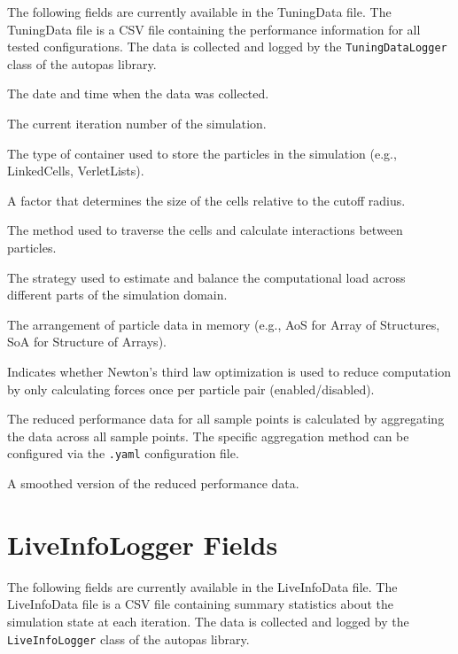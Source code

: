 The following fields are currently available in the TuningData file.
The TuningData file is a CSV file containing the performance information for all tested configurations. The data is collected and logged by the \texttt{TuningDataLogger} class of the \gls{autopas} library.

\begin{description}[style=multiline, leftmargin =40mm]
  \item[Date] The date and time when the data was collected.
  \item[Iteration] The current iteration number of the simulation.
  \item[Container] The type of container used to store the particles in the simulation (e.g., LinkedCells, VerletLists).
  \item[CellSizeFactor] A factor that determines the size of the cells relative to the cutoff radius.
  \item[Traversal] The method used to traverse the cells and calculate interactions between particles.
  \item[Load Estimator] The strategy used to estimate and balance the computational load across different parts of the simulation domain.
  \item[Data Layout] The arrangement of particle data in memory (e.g., AoS for Array of Structures, SoA for Structure of Arrays).
  \item[Newton 3] Indicates whether Newton's third law optimization is used to reduce computation by only calculating forces once per particle pair (enabled/disabled).
  \item[Reduced] The reduced performance data for all sample points is calculated by aggregating the data across all sample points. The specific aggregation method can be configured via the \texttt{.yaml} configuration file.
  \item[Smoothed] A smoothed version of the reduced performance data.

\end{description}

\section{LiveInfoLogger Fields}
\label{des:liveinfodatafields}

The following fields are currently available in the LiveInfoData file. The LiveInfoData file is a CSV file containing summary statistics about the simulation state at each iteration. The data is collected and logged by the \texttt{LiveInfoLogger} class of the \gls{autopas} library.

